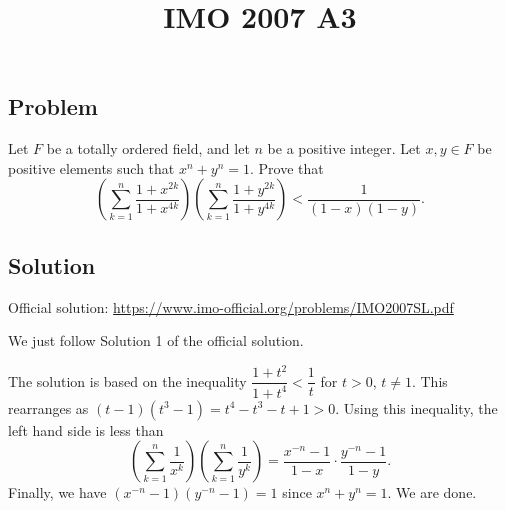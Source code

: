 \documentclass{article}
\title{IMO 2007 A3}
\author{}
\date{}
\begin{document}
\maketitle



\subsection*{Problem}

Let $F$ be a totally ordered field, and let $n$ be a positive integer.
Let $x, y \in F$ be positive elements such that $x^n + y^n = 1$.
Prove that
\[ \left(\sum_{k = 1}^n \frac{1 + x^{2k}}{1 + x^{4k}}\right) \left(\sum_{k = 1}^n \frac{1 + y^{2k}}{1 + y^{4k}}\right) < \frac{1}{(1 - x)(1 - y)}. \]



\subsection*{Solution}

Official solution: \url{https://www.imo-official.org/problems/IMO2007SL.pdf}

We just follow Solution 1 of the official solution.

The solution is based on the inequality $\dfrac{1 + t^2}{1 + t^4} < \dfrac{1}{t}$ for $t > 0$, $t \neq 1$.
This rearranges as $(t - 1)(t^3 - 1) = t^4 - t^3 - t + 1 > 0$.
Using this inequality, the left hand side is less than
\[ \left(\sum_{k = 1}^n \frac{1}{x^k}\right) \left(\sum_{k = 1}^n \frac{1}{y^k}\right) = \frac{x^{-n} - 1}{1 - x} \cdot \frac{y^{-n} - 1}{1 - y}. \]
Finally, we have $(x^{-n} - 1)(y^{-n} - 1) = 1$ since $x^n + y^n = 1$.
We are done.
\end{document}
